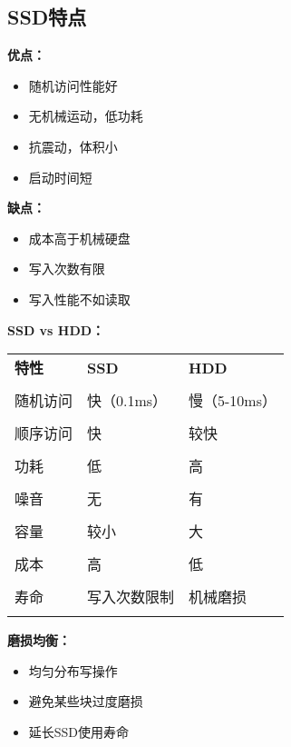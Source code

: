 \documentclass[lang=cn,newtx,10pt,scheme=chinese]{../../elegantbook}
\begin{document}
\subsection{SSD特点}

\textbf{优点：}
\begin{itemize}
  \item 随机访问性能好
  \item 无机械运动，低功耗
  \item 抗震动，体积小
  \item 启动时间短
\end{itemize}

\textbf{缺点：}
\begin{itemize}
  \item 成本高于机械硬盘
  \item 写入次数有限
  \item 写入性能不如读取
\end{itemize}

\textbf{SSD vs HDD：}
\begin{longtable}{@{}p{3cm}p{4cm}p{4cm}@{}}
\toprule
\textbf{特性} & \textbf{SSD} & \textbf{HDD} \\\\ \midrule
\endhead

随机访问 & 快（0.1ms） & 慢（5-10ms） \\\\
顺序访问 & 快 & 较快 \\\\
功耗 & 低 & 高 \\\\
噪音 & 无 & 有 \\\\
容量 & 较小 & 大 \\\\
成本 & 高 & 低 \\\\
寿命 & 写入次数限制 & 机械磨损 \\\\

\bottomrule
\end{longtable}

\textbf{磨损均衡：}
\begin{itemize}
  \item 均匀分布写操作
  \item 避免某些块过度磨损
  \item 延长SSD使用寿命
\end{itemize}

\end{document}
